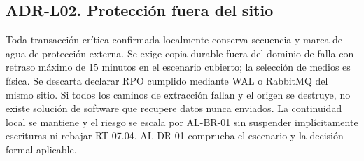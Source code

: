 \subsection*{ADR-L02. Protección fuera del sitio}
Toda transacción crítica confirmada localmente conserva secuencia y marca de agua de protección externa. Se exige copia durable fuera del dominio de falla con retraso máximo de 15 minutos en el escenario cubierto; la selección de medios es física. Se descarta declarar RPO cumplido mediante WAL o RabbitMQ del mismo sitio. Si todos los caminos de extracción fallan y el origen se destruye, no existe solución de software que recupere datos nunca enviados. La continuidad local se mantiene y el riesgo se escala por AL-BR-01 sin suspender implícitamente escrituras ni rebajar RT-07.04. AL-DR-01 comprueba el escenario y la decisión formal aplicable.
